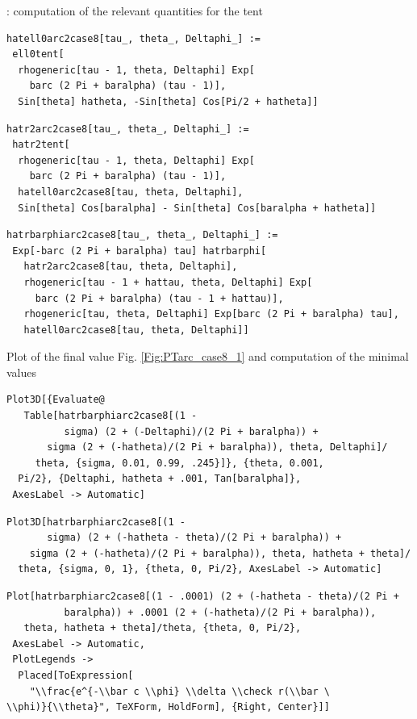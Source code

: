 \documentclass[reqno]{amsart}
\theoremstyle{definition} \newtheorem{definition}{Definition}[section]
\theoremstyle{definition} \newtheorem{remark}[definition]{Remark}
\theoremstyle{plain} \newtheorem{lemma}[definition]{Lemma}
\theoremstyle{plain} \newtheorem{proposition}[definition]{Proposition}
\theoremstyle{plain} \newtheorem{theorem}[definition]{Theorem}
\theoremstyle{plain} \newtheorem{corollary}[definition]{Corollary}
\theoremstyle{definition} \newtheorem{example}[definition]{Example}
\theoremstyle{plain} \newtheorem{claim}[clai]{Claim}
\theoremstyle{definition} \newtheorem{assumption}[definition]{Assumption}
\theoremstyle{definition} \newtheorem{observation}[definition]{Observation}
\newcommand{\1}{\mathbbm 1}
\newcommand{\smed}{\medskip}
\numberwithin{equation}{section} %
\theoremstyle{plain} \newtheorem*{theorem*}{Theorem}
\theoremstyle{plain} \newtheorem{mthm}[maintheorem]{Main Theorem}
\theoremstyle{plain} \newtheorem*{mthm*}{Main Theorem}
\theoremstyle{plain} \newtheorem*{conjecture*}{Conjecture}
\theoremstyle{plain} \newtheorem{conjecture}[definition]{Conjecture}
\theoremstyle{plain} \newtheorem*{problem*}{Problem}
\begin{document}
: computation of the relevant quantities for the tent
\smed
\begin{verbatim}
hatell0arc2case8[tau_, theta_, Deltaphi_] := 
 ell0tent[
  rhogeneric[tau - 1, theta, Deltaphi] Exp[
    barc (2 Pi + baralpha) (tau - 1)], 
  Sin[theta] hatheta, -Sin[theta] Cos[Pi/2 + hatheta]]
\end{verbatim}
\begin{verbatim}
hatr2arc2case8[tau_, theta_, Deltaphi_] := 
 hatr2tent[
  rhogeneric[tau - 1, theta, Deltaphi] Exp[
    barc (2 Pi + baralpha) (tau - 1)], 
  hatell0arc2case8[tau, theta, Deltaphi], 
  Sin[theta] Cos[baralpha] - Sin[theta] Cos[baralpha + hatheta]]
\end{verbatim}
\begin{verbatim}
hatrbarphiarc2case8[tau_, theta_, Deltaphi_] := 
 Exp[-barc (2 Pi + baralpha) tau] hatrbarphi[
   hatr2arc2case8[tau, theta, Deltaphi], 
   rhogeneric[tau - 1 + hattau, theta, Deltaphi] Exp[
     barc (2 Pi + baralpha) (tau - 1 + hattau)], 
   rhogeneric[tau, theta, Deltaphi] Exp[barc (2 Pi + baralpha) tau], 
   hatell0arc2case8[tau, theta, Deltaphi]]
\end{verbatim}
\smed
Plot of the final value Fig. \ref{Fig:PTarc_case8_1} and computation of the minimal values
\smed
\begin{verbatim}
Plot3D[{Evaluate@
   Table[hatrbarphiarc2case8[(1 - 
          sigma) (2 + (-Deltaphi)/(2 Pi + baralpha)) + 
       sigma (2 + (-hatheta)/(2 Pi + baralpha)), theta, Deltaphi]/
     theta, {sigma, 0.01, 0.99, .245}]}, {theta, 0.001, 
  Pi/2}, {Deltaphi, hatheta + .001, Tan[baralpha]}, 
 AxesLabel -> Automatic]
\end{verbatim}
\begin{verbatim}
Plot3D[hatrbarphiarc2case8[(1 - 
       sigma) (2 + (-hatheta - theta)/(2 Pi + baralpha)) + 
    sigma (2 + (-hatheta)/(2 Pi + baralpha)), theta, hatheta + theta]/
  theta, {sigma, 0, 1}, {theta, 0, Pi/2}, AxesLabel -> Automatic]
\end{verbatim}
\begin{verbatim}
Plot[hatrbarphiarc2case8[(1 - .0001) (2 + (-hatheta - theta)/(2 Pi + 
          baralpha)) + .0001 (2 + (-hatheta)/(2 Pi + baralpha)), 
   theta, hatheta + theta]/theta, {theta, 0, Pi/2}, 
 AxesLabel -> Automatic, 
 PlotLegends -> 
  Placed[ToExpression[
    "\\frac{e^{-\\bar c \\phi} \\delta \\check r(\\bar \
\\phi)}{\\theta}", TeXForm, HoldForm], {Right, Center}]]
\end{verbatim}
\end{document}
